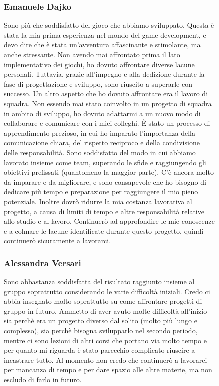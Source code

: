 \documentclass[a4paper,12pt]{report}
\begin{document}
\begin{figure}[h]
\subsubsection{Emanuele Dajko}
Sono più che soddisfatto del gioco che abbiamo sviluppato.
Questa è stata la mia prima esperienza nel mondo del game development, e devo dire che è stata un'avventura affascinante e stimolante, ma anche stressante.
Non avendo mai affrontato prima il lato implementativo dei giochi, ho dovuto affrontare diverse lacune personali.
Tuttavia, grazie all'impegno e alla dedizione durante la fase di progettazione e sviluppo, sono riuscito a superarle con successo.
Un altro aspetto che ho dovuto affrontare era il lavoro di squadra.
Non essendo mai stato coinvolto in un progetto di squadra in ambito di sviluppo, ho dovuto adattarmi a un nuovo modo di collaborare e comunicare con i miei colleghi.
È stato un processo di apprendimento prezioso, in cui ho imparato l'importanza della comunicazione chiara, del rispetto reciproco e della condivisione delle responsabilità.
Sono soddisfatto del modo in cui abbiamo lavorato insieme come team, superando le sfide e raggiungendo gli obiettivi prefissati (quantomeno la maggior parte).
C'è ancora molto da imparare e da migliorare, e sono consapevole che ho bisogno di dedicare più tempo e preparazione per raggiungere il mio pieno potenziale.
Inoltre dovrò ridurre la mia costanza lavorativa al progetto, a causa di limiti di tempo e altre responsabilità relative allo studio e al lavoro.
Continuerò ad approfondire le mie conoscenze e a colmare le lacune identificate durante questo progetto, quindi continuerò sicuramente a lavorarci.

\subsubsection{Alessandra Versari}
Sono abbastanza soddisfatta del risultato raggiunto insieme al gruppo soprattutto considerando le varie difficoltà iniziali. Credo ci abbia insegnato molto soprattutto su come affrontare progetti di gruppo in futuro. Ammetto di aver avuto molte difficoltà all'inizio sia perchè era un progetto diverso dal solito (molto più lungo e complesso), sia perchè bisogna svilupparlo nel secondo periodo, mentre ci sono lezioni di altri corsi che portano via molto tempo e per quanto mi riguarda è stato parecchio complicato riuscire a incastrare tutto. Al momento non credo che continuerò a lavorarci per mancanza di tempo e per dare spazio alle altre materie, ma non escludo di farlo in futuro. 


\end{figure}
\end{document}
